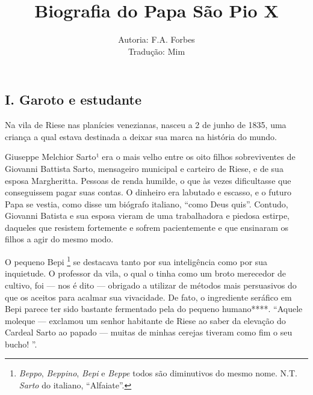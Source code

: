 \documentclass[12pt,a4paper,oneside]{book}
\title{\textbf {Biografia do Papa São Pio X}}
\author{Autoria: F.A. Forbes \\ Tradução: Mim}
\begin{document}
\setcounter{page}{3}



\maketitle

\pagebreak
\quad
\thispagestyle{fancy}



\pagebreak

\begin{center}
    {\section*{I. Garoto e estudante}}

\end{center}

 
\quad Na vila de Riese nas planícies venezianas, nasceu a 2 de junho de 1835, uma criança a qual estava destinada a deixar sua marca na história do mundo.

\quad Giuseppe Melchior Sarto¹ era o mais velho entre os oito filhos sobreviventes de Giovanni Battista Sarto, mensageiro municipal e carteiro de Riese, e de sua esposa Margheritta. Pessoas de renda humilde, o que às vezes dificultasse que conseguissem pagar suas contas. O dinheiro era labutado e escasso, e o futuro Papa se vestia, como disse um biógrafo italiano, ``como Deus quis''. Contudo, Giovanni Batista e sua esposa vieram de uma trabalhadora e piedosa estirpe, daqueles que resistem fortemente e sofrem pacientemente e que ensinaram os filhos a agir do mesmo modo.



O pequeno Bepi
 \footnote[1]{\emph{Beppo}, \emph{Beppino}, \emph{Bepi} e \emph{Beppe} todos são diminutivos do mesmo nome.
N.T. \emph{Sarto} do italiano, ``Alfaiate''.}
se destacava tanto por sua inteligência como por sua inquietude. O professor da vila, o qual o tinha como um broto merecedor de cultivo, foi --- nos é dito --- obrigado a utilizar de métodos mais persuasivos do que os aceitos para acalmar sua vivacidade. De fato, o ingrediente seráfico em Bepi
 parece ter sido bastante fermentado pela do pequeno humano****. ``Aquele moleque --- exclamou um senhor habitante de Riese ao saber da elevação do Cardeal Sarto ao papado --- muitas de minhas cerejas tiveram como fim o seu bucho! ''.
\end{document}
